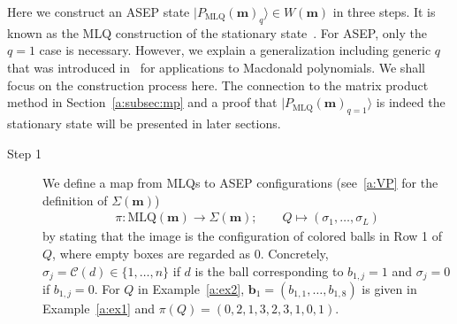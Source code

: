 \documentclass[11pt]{article}
\theoremstyle{definition}
\numberwithin{equation}{section}
\newcommand{\ket}[1]{\lvert #1 \rangle}
\newcommand{\bb}{\mathbf{b}}
\newcommand{\mm}{\mathbf{m}}
\begin{document}
Here we construct an ASEP state  $\ket{P_{\text{MLQ}}(\mm)_q} \in W(\mm)$
in three steps.
It is known as the MLQ construction of the stationary state~\cite{CMW,Martin20}.
For ASEP, only the $q = 1$ case is necessary.
However, we explain a generalization including generic $q$ that was introduced in~\cite{CMW} for applications to Macdonald polynomials.
We shall focus on the construction process here.
The connection to the matrix product method in Section~\ref{a:subsec:mp} and a proof that 
$\ket{P_{\text{MLQ}}(\mm)_{q=1}}$ is indeed the stationary state will be presented in later sections.
\begin{description}
\item[Step 1]
We define a map from MLQs to ASEP configurations (see~\eqref{a:VP} for the 
definition of $\Sigma(\mm)$)
\begin{align}\label{a:pi}
\pi\colon \text{MLQ}(\mm) \rightarrow \Sigma(\mm); \qquad Q \mapsto (\sigma_1,\ldots, \sigma_L)
\end{align}
by stating that the image is the configuration of colored balls in Row 1 of $Q$, where 
empty boxes are regarded as 0.
Concretely, $\sigma_j = \mathcal{C}(d) \in \{1,\ldots, n\}$ if $d$ is 
the ball corresponding to $b_{1,j} = 1$ and 
$\sigma_j = 0$ if $b_{1,j} = 0$. 
For $Q$ in Example~\ref{a:ex2}, 
$\bb_1=(b_{1,1},\ldots, b_{1,8})$ 
is given in Example~\ref{a:ex1} and $\pi(Q) = (0,2,1,3,2,3,1,0,1)$.


\end{description}
\end{document}
